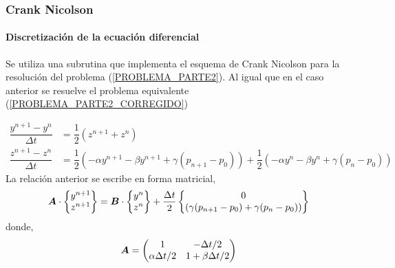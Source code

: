 \subsubsection{Crank Nicolson}

\paragraph{Discretización de la ecuación diferencial} Se utiliza una subrutina que implementa el esquema de Crank Nicolson para la resolución del problema (\ref{PROBLEMA_PARTE2}). Al igual que en el caso anterior se resuelve el problema equivalente (\ref{PROBLEMA_PARTE2_CORREGIDO})

\begin{align}
\dfrac{y^{n+1}-y^n}{\Delta t} & = \dfrac{1}{2} \left( z^{n+1} + z^n \right) \\
\dfrac{z^{n+1}-z^n}{\Delta t} &= \dfrac{1}{2} \left( -\alpha y^{n+1} - \beta y^{n+1} + \gamma (p_{n+1}-p_0) \right) + \dfrac{1}{2} \left( -\alpha y^{n} - \beta y^{n} + \gamma (p_{n}-p_0) \right)  
\end{align}
La relación anterior se escribe en forma matricial,
\begin{equation}
\boldsymbol{A} \cdot
\begin{Bmatrix}
y^{n+1} \\ z^{n+1}
\end{Bmatrix} =
\boldsymbol{B} \cdot
\begin{Bmatrix}
y^n \\ z^n
\end{Bmatrix} + \dfrac{\Delta t}{2}
\begin{Bmatrix}
0 \\ \left( \gamma (p_{n+1}-p_0) + \gamma (p_{n}-p_0) \right)
\end{Bmatrix}
\end{equation}
donde,
\begin{equation}
\boldsymbol{A} = \begin{pmatrix}
1 & -\Delta t /2 \\
\alpha \Delta t / 2 & 1+ \beta \Delta t / 2
\end{pmatrix} 
\end{equation}

